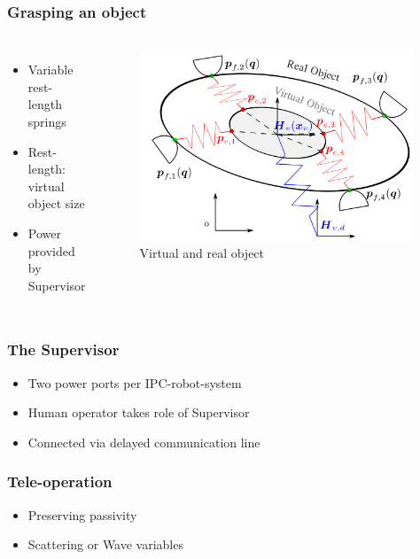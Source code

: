 \documentclass[student]{ITRslides}
\begin{document}
\begin{frame}
	\frametitle{Grasping an object}
\begin{columns}
			
	
		\begin{itemize}
			\item Variable rest-length springs
			\item Rest-length: virtual object size
			\item Power provided by Supervisor
		\end{itemize}

		
             \begin{figure}[htb]
			\centering
			\includegraphics[width=0.98\textwidth]{IPCobjects.png}
			\caption{Virtual and real object \cite{Wimboeck_08}}
			\end{figure}
		
			
		\end{columns}
\end{frame}

\begin{frame}
	\frametitle{The Supervisor}
	\begin{itemize}
			\item Two power ports per IPC-robot-system
			\item Human operator takes role of Supervisor
			\item Connected via delayed communication line
		\end{itemize}
\end{frame}

\begin{frame}
	\frametitle{Tele-operation}
	\begin{itemize}
			\item Preserving passivity
			\item Scattering or Wave variables
		\end{itemize}
\end{frame}
\end{document}
